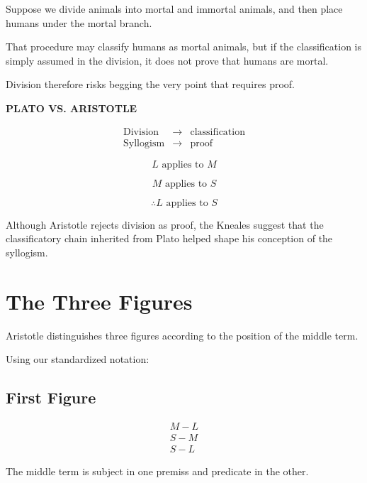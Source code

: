 \documentclass[11pt]{article}
\begin{document}
Suppose we divide animals into mortal and immortal animals, and
then place humans under the mortal branch.

That procedure may classify humans as mortal animals, but if the
classification is simply assumed in the division, it does not prove
that humans are mortal.

Division therefore risks begging the very point that requires
proof.

\begin{whiteboard}
\textbf{PLATO VS. ARISTOTLE}

\[
\begin{array}{rcl}
\text{Division}
&\rightarrow&
\text{classification}
\\[0.4em]
\text{Syllogism}
&\rightarrow&
\text{proof}
\end{array}
\]

\vspace{0.5em}

\[
L\text{ applies to }M
\]

\[
M\text{ applies to }S
\]

\[
\therefore
L\text{ applies to }S
\]
\end{whiteboard}

Although Aristotle rejects division as proof, the Kneales suggest
that the classificatory chain inherited from Plato helped shape
his conception of the syllogism.

\section{The Three Figures}

Aristotle distinguishes three figures according to the position of
the middle term.

Using our standardized notation:

\subsection{First Figure}

\[
\begin{array}{l}
M-L\\
S-M\\
\hline
S-L
\end{array}
\]

The middle term is subject in one premiss and predicate in the
other.
\end{document}
